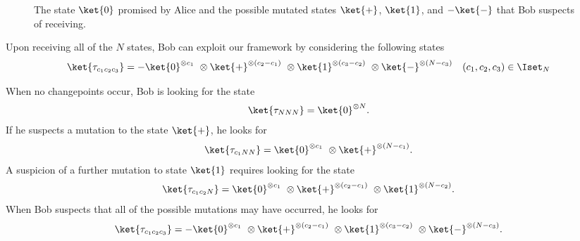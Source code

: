 \begin{appendices}
\begin{figure}[htbp]
\begin{tikzpicture}
    \end{tikzpicture}

    \caption{%
        The state $\ket{0}$ promised by Alice and the possible mutated states $\ket{+}$, $\ket{1}$, and $-\ket{-}$ that Bob suspects of receiving.
    }
    \label{fig:ch3_QSD-pi_4_states}
\end{figure}

Upon receiving all of the $N$ states, Bob can exploit our framework by considering the following states
\begin{equation}
    \label{eq:ch3_QSD-Bob's_suspicion_succinct}
    \begin{aligned}
        \ket{\tau_{c_1 c_2 c_3}} = -\ket{0}^{\otimes c_1}\ \otimes \ket{+}^{\otimes (c_2 - c_1)}\ \otimes \ket{1}^{\otimes (c_3 - c_2)}\ \otimes \ket{-}^{\otimes (N - c_3)} %
        \quad (c_1, c_2, c_3) \in \Iset_N
    \end{aligned}
\end{equation}

When no changepoints occur, Bob is looking for the state
\begin{align}
    \label{eq:ch3_QSD-no_CP_eg}
    \ket{\tau_{N N N}} = \ket{0}^{\otimes N}.
\end{align}
If he suspects a mutation to the state $\ket{+}$, he looks for
\begin{align}
    \label{eq:ch3_QSD-1CP_eg}
    \ket{\tau_{c_1 N N}} = \ket{0}^{\otimes c_1}\ \otimes \ket{+}^{\otimes (N - c_1)}.
\end{align}
A suspicion of a further mutation to state $\ket{1}$ requires looking for the state
\begin{align}
    \label{eq:ch3_QSD-2CP_eg}
    \ket{\tau_{c_1 c_2 N}} = \ket{0}^{\otimes c_1}\ \otimes \ket{+}^{\otimes (c_2 - c_1)}\ \otimes \ket{1}^{\otimes (N - c_2)}.
\end{align}
When Bob suspects that all of the possible mutations may have occurred, he looks for
\begin{align}
    \label{eq:ch3_QSD-3CP_eg}
    \ket{\tau_{c_1 c_2 c_3}} = - \ket{0}^{\otimes c_1}\ \otimes \ket{+}^{\otimes (c_2 - c_1)}\ \otimes \ket{1}^{\otimes (c_3 - c_2)}\ \otimes \ket{-}^{\otimes (N - c_3)}.
\end{align}

\end{appendices}
